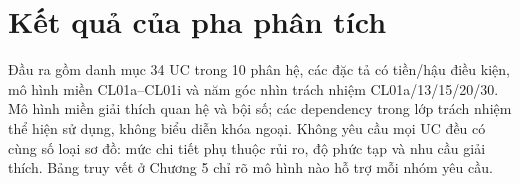 \section{Kết quả của pha phân tích}
Đầu ra gồm danh mục 34 UC trong 10 phân hệ, các đặc tả có tiền/\allowbreak{}hậu điều kiện, mô hình miền CL01a--CL01i và năm góc nhìn trách nhiệm CL01a/\allowbreak{}13/\allowbreak{}15/\allowbreak{}20/\allowbreak{}30. Mô hình miền giải thích quan hệ và bội số; các dependency trong lớp trách nhiệm thể hiện sử dụng, không biểu diễn khóa ngoại. Không yêu cầu mọi UC đều có cùng số loại sơ đồ: mức chi tiết phụ thuộc rủi ro, độ phức tạp và nhu cầu giải thích. Bảng truy vết ở Chương 5 chỉ rõ mô hình nào hỗ trợ mỗi nhóm yêu cầu.

